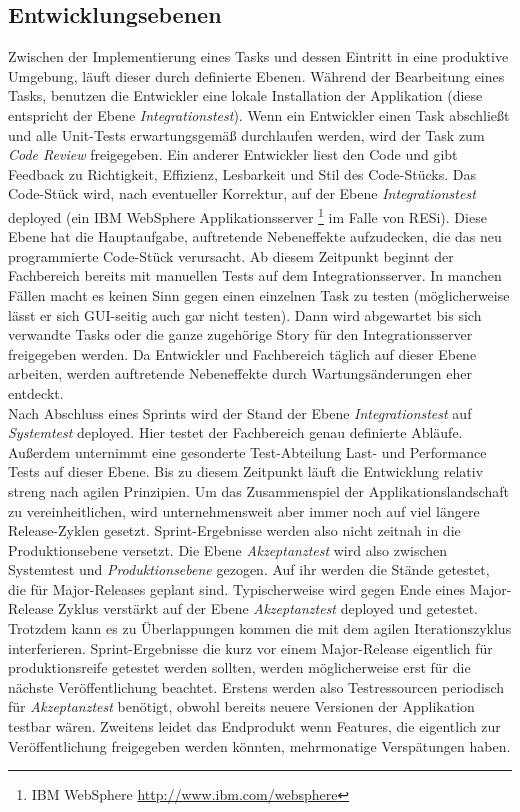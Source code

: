 \subsection{Entwicklungsebenen}
Zwischen der Implementierung eines Tasks und dessen Eintritt in eine produktive Umgebung, läuft dieser durch definierte Ebenen. Während der Bearbeitung eines Tasks, benutzen die Entwickler eine lokale Installation der Applikation (diese entspricht der Ebene \textit{Integrationstest}). Wenn ein Entwickler einen Task abschließt und alle Unit-Tests erwartungsgemäß durchlaufen werden, wird der Task zum \textit{Code Review} freigegeben. Ein anderer Entwickler liest den Code und gibt Feedback zu Richtigkeit, Effizienz, Lesbarkeit und Stil des Code-Stücks. Das Code-Stück wird, nach eventueller Korrektur, auf der Ebene \textit{Integrationstest} deployed (ein IBM WebSphere Applikationsserver \footnote{IBM WebSphere \url{http://www.ibm.com/websphere}} im Falle von RESi). Diese Ebene hat die Hauptaufgabe, auftretende Nebeneffekte aufzudecken, die das neu programmierte Code-Stück verursacht. Ab diesem Zeitpunkt beginnt der Fachbereich bereits mit manuellen Tests auf dem Integrationsserver. In manchen Fällen macht es keinen Sinn gegen einen einzelnen Task zu testen (möglicherweise lässt er sich GUI-seitig auch gar nicht testen). Dann wird abgewartet bis sich verwandte Tasks oder die ganze zugehörige Story für den Integrationsserver freigegeben werden. Da Entwickler und Fachbereich täglich auf dieser Ebene arbeiten, werden auftretende Nebeneffekte durch Wartungsänderungen eher entdeckt.\\
Nach Abschluss eines Sprints wird der Stand der Ebene \textit{Integrationstest} auf \textit{Systemtest} deployed. Hier testet der Fachbereich genau definierte Abläufe. Außerdem unternimmt eine gesonderte Test-Abteilung Last- und Performance Tests auf dieser Ebene. Bis zu diesem Zeitpunkt läuft die Entwicklung relativ streng nach agilen Prinzipien. Um das Zusammenspiel der Applikationslandschaft zu vereinheitlichen, wird unternehmensweit aber immer noch auf viel längere Release-Zyklen gesetzt. Sprint-Ergebnisse werden also nicht zeitnah in die Produktionsebene versetzt. Die Ebene \textit{Akzeptanztest} wird also zwischen Systemtest und \textit{Produktionsebene} gezogen. Auf ihr werden die Stände getestet, die für Major-Releases geplant sind. Typischerweise wird gegen Ende eines Major-Release Zyklus verstärkt auf der Ebene \textit{Akzeptanztest} deployed und getestet. Trotzdem kann es zu Überlappungen kommen die mit dem agilen Iterationszyklus interferieren. Sprint-Ergebnisse die kurz vor einem Major-Release eigentlich für produktionsreife getestet werden sollten, werden möglicherweise erst für die nächste Veröffentlichung beachtet. Erstens werden also Testressourcen periodisch für \textit{Akzeptanztest} benötigt, obwohl bereits neuere Versionen der Applikation testbar wären. Zweitens leidet das Endprodukt wenn Features, die eigentlich zur Veröffentlichung freigegeben werden könnten, mehrmonatige Verspätungen haben.

